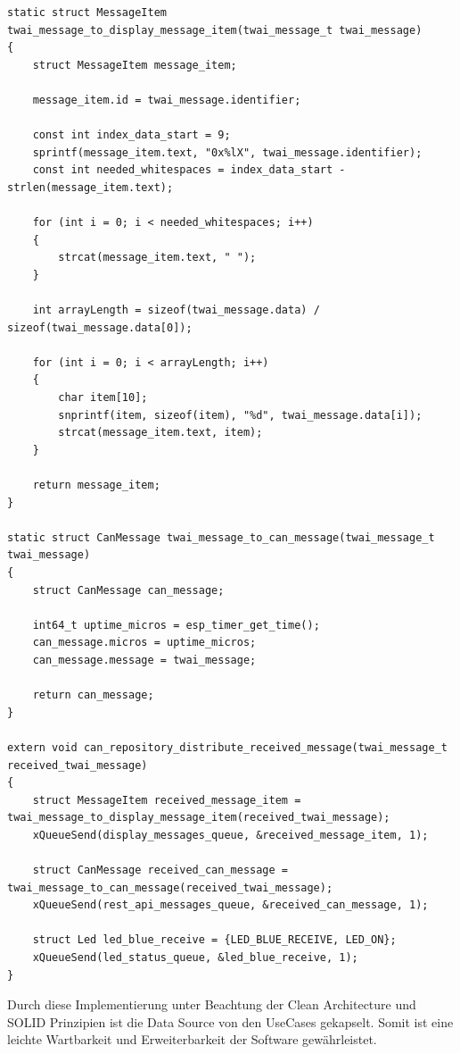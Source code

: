 \begin{lstlisting}
static struct MessageItem twai_message_to_display_message_item(twai_message_t twai_message)
{
    struct MessageItem message_item;

    message_item.id = twai_message.identifier;

    const int index_data_start = 9;
    sprintf(message_item.text, "0x%lX", twai_message.identifier);
    const int needed_whitespaces = index_data_start - strlen(message_item.text);

    for (int i = 0; i < needed_whitespaces; i++)
    {
        strcat(message_item.text, " ");
    }

    int arrayLength = sizeof(twai_message.data) / sizeof(twai_message.data[0]);

    for (int i = 0; i < arrayLength; i++)
    {
        char item[10];
        snprintf(item, sizeof(item), "%d", twai_message.data[i]);
        strcat(message_item.text, item);
    }

    return message_item;
}

static struct CanMessage twai_message_to_can_message(twai_message_t twai_message)
{
    struct CanMessage can_message;

    int64_t uptime_micros = esp_timer_get_time();
    can_message.micros = uptime_micros;
    can_message.message = twai_message;

    return can_message;
}

extern void can_repository_distribute_received_message(twai_message_t received_twai_message)
{
    struct MessageItem received_message_item = twai_message_to_display_message_item(received_twai_message);
    xQueueSend(display_messages_queue, &received_message_item, 1);

    struct CanMessage received_can_message = twai_message_to_can_message(received_twai_message);
    xQueueSend(rest_api_messages_queue, &received_can_message, 1);

    struct Led led_blue_receive = {LED_BLUE_RECEIVE, LED_ON};
    xQueueSend(led_status_queue, &led_blue_receive, 1);
}
\end{lstlisting}
Durch diese Implementierung unter Beachtung der Clean Architecture und SOLID Prinzipien ist die Data Source von den UseCases gekapselt. Somit ist eine leichte Wartbarkeit und Erweiterbarkeit der Software gewährleistet.

